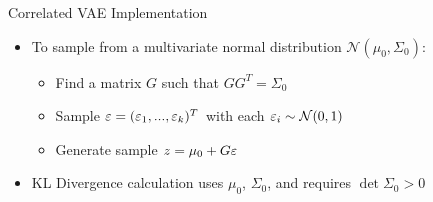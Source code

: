 \documentclass{beamer}
\def \e{\ensuremath \varepsilon}
\theoremstyle{definition}
\begin{document}
\begin{frame}{Correlated VAE Implementation}
\begin{itemize}
  \item To sample from a multivariate normal distribution $\mathcal{N}(\mu_0, \Sigma_0)$:
  \begin{itemize}
    \item Find a matrix $G$ such that $G G^T = \Sigma_0$
    \item Sample $\e = (\e_1,...,\e_k)^T$ with each $\e_i \sim \mathcal{N}(0,1)$
    \item Generate sample $z = \mu_0 + G\e$
  \end{itemize}
  \item<2-> KL Divergence calculation uses $\mu_0$, $\Sigma_0$, and requires $\det \Sigma_0 > 0$
\end{itemize}
\begin{figure}
\end{figure}
\end{frame}
\end{document}
